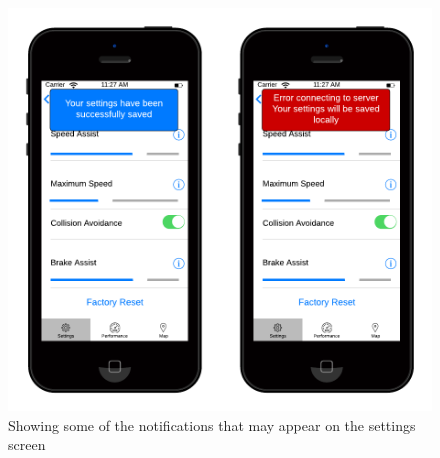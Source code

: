 \documentclass[a4paper]{report}
\begin{document}
{\begin{figure}[H]
\includegraphics[scale=0.6]{figures/final_design/settings_notify}
\caption{Showing some of the notifications that may appear on the settings screen}
\end{figure}
\begin{figure}[h]
\centering

\end{figure}}
\end{document}
